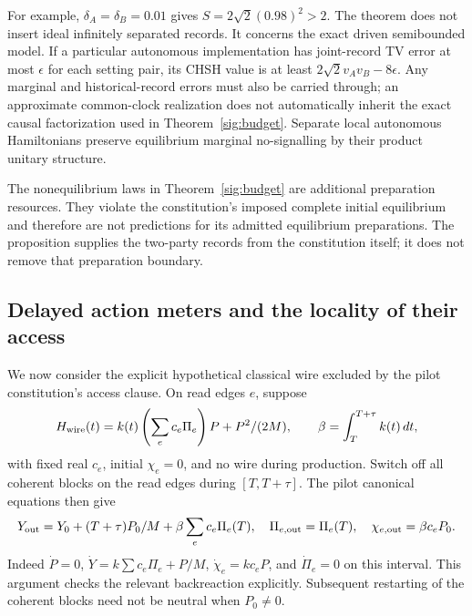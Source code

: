 \documentclass[11pt,a4paper]{article}
\theoremstyle{definition}
\theoremstyle{remark}\newtheorem{remark}[theorem]{Remark}
\begin{document}
For example, $\delta_A=\delta_B=0.01$ gives
$S=2\sqrt2(0.98)^2>2$. The theorem does not insert ideal infinitely
separated records. It concerns the exact driven semibounded model.
If a particular autonomous implementation has joint-record TV error
at most $\epsilon$ for each setting pair, its CHSH value is at least
$2\sqrt2v_Av_B-8\epsilon$. Any marginal and historical-record errors
must also be carried through; an approximate common-clock realization
does not automatically inherit the exact causal factorization used in
Theorem~\ref{sig:budget}. Separate local autonomous Hamiltonians preserve
equilibrium marginal no-signalling by their product unitary structure.

The nonequilibrium laws in Theorem~\ref{sig:budget} are additional
preparation resources. They violate the constitution's imposed complete
initial equilibrium and therefore are not predictions for its admitted
equilibrium preparations. The proposition supplies the two-party records from the constitution itself; it does not remove that preparation boundary.

\subsection{Delayed action meters and the locality of their access}

We now consider the explicit hypothetical classical wire excluded by
the pilot constitution's access clause. On read edges $e$, suppose
\[
 H_{\rm wire}(t)=k(t)\left(\sum_e c_e\Pi_e\right)P+P^2/(2M),
 \qquad \beta=\int_T^{T+\tau}k(t)\,dt,
\]
with fixed real $c_e$, initial $\chi_e=0$, and no wire during
production. Switch off all coherent blocks on the read edges during
$[T,T+\tau]$. The pilot canonical equations then give
\begin{equation}\label{sig:wire}
 Y_{\rm out}=Y_0+(T+\tau)P_0/M+\beta\sum_e c_e\Pi_e(T),
 \quad \Pi_{e,\rm out}=\Pi_e(T),\quad
 \chi_{e,\rm out}=\beta c_eP_0.
\end{equation}
Indeed $\dot P=0$, $\dot Y=k\sum c_e\Pi_e+P/M$,
$\dot\chi_e=kc_eP$, and $\dot\Pi_e=0$ on this interval. This argument
checks the relevant backreaction explicitly. Subsequent restarting of
the coherent blocks need not be neutral when $P_0\ne0$.
\end{document}
